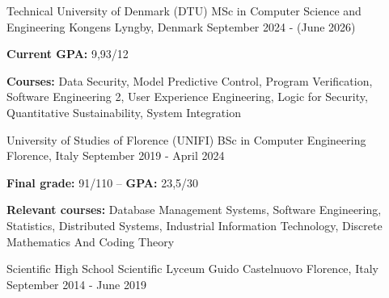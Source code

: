 

\begin{cventries}

  \cventry
    {Technical University of Denmark (DTU)} %
    {MSc in Computer Science and Engineering} %
    {Kongens Lyngby, Denmark} %
    {September 2024 - (June 2026)} %
    {
      \begin{cvitems} %
        \item {\textbf{Current GPA:} 9,93/12}
        \item {\textbf{Courses:} Data Security, Model Predictive Control, Program Verification, Software Engineering 2, User Experience Engineering, Logic for Security, Quantitative Sustainability, System Integration}
      \end{cvitems}
    }

  \cventry
    {University of Studies of Florence (UNIFI)} %
    {BSc in Computer Engineering} %
    {Florence, Italy} %
    {September 2019 - April 2024} %
    {
      \begin{cvitems} %
        \item {\textbf{Final grade:} 91/110 – \textbf{GPA:} 23,5/30}
        \item {\textbf{Relevant courses:} Database Management Systems, Software Engineering, Statistics, Distributed Systems, Industrial Information Technology, Discrete Mathematics And Coding Theory}
      \end{cvitems}
    }

  \cventry
    {Scientific High School} %
    {Scientific Lyceum Guido Castelnuovo} %
    {Florence, Italy} %
    {September 2014 - June 2019} %
    {}
\end{cventries}
